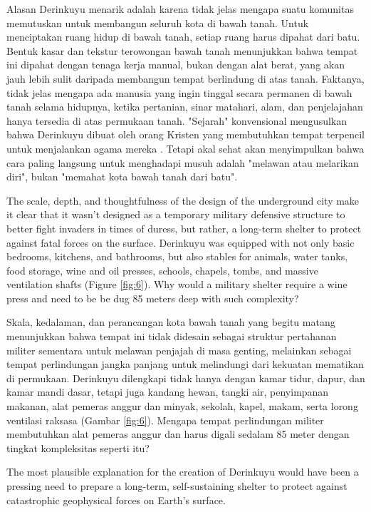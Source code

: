 \documentclass[10pt,twocolumn,letterpaper]{article}
\begin{document}
Alasan Derinkuyu menarik adalah karena tidak jelas mengapa suatu komunitas memutuskan untuk membangun seluruh kota di bawah tanah. Untuk menciptakan ruang hidup di bawah tanah, setiap ruang harus dipahat dari batu. Bentuk kasar dan tekstur terowongan bawah tanah menunjukkan bahwa tempat ini dipahat dengan tenaga kerja manual, bukan dengan alat berat, yang akan jauh lebih sulit daripada membangun tempat berlindung di atas tanah. Faktanya, tidak jelas mengapa ada manusia yang ingin tinggal secara permanen di bawah tanah selama hidupnya, ketika pertanian, sinar matahari, alam, dan penjelajahan hanya tersedia di atas permukaan tanah. "Sejarah" konvensional mengusulkan bahwa Derinkuyu dibuat oleh orang Kristen yang membutuhkan tempat terpencil untuk menjalankan agama mereka \cite{53}. Tetapi akal sehat akan menyimpulkan bahwa cara paling langsung untuk menghadapi musuh adalah "melawan atau melarikan diri", bukan "memahat kota bawah tanah dari batu".

The scale, depth, and thoughtfulness of the design of the underground city make it clear that it wasn't designed as a temporary military defensive structure to better fight invaders in times of duress, but rather, a long-term shelter to protect against fatal forces on the surface. Derinkuyu was equipped with not only basic bedrooms, kitchens, and bathrooms, but also stables for animals, water tanks, food storage, wine and oil presses, schools, chapels, tombs, and massive ventilation shafts (Figure \ref{fig:6}). Why would a military shelter require a wine press and need to be be dug 85 meters deep with such complexity?

Skala, kedalaman, dan perancangan kota bawah tanah yang begitu matang menunjukkan bahwa tempat ini tidak didesain sebagai struktur pertahanan militer sementara untuk melawan penjajah di masa genting, melainkan sebagai tempat perlindungan jangka panjang untuk melindungi dari kekuatan mematikan di permukaan. Derinkuyu dilengkapi tidak hanya dengan kamar tidur, dapur, dan kamar mandi dasar, tetapi juga kandang hewan, tangki air, penyimpanan makanan, alat pemeras anggur dan minyak, sekolah, kapel, makam, serta lorong ventilasi raksasa (Gambar \ref{fig:6}). Mengapa tempat perlindungan militer membutuhkan alat pemeras anggur dan harus digali sedalam 85 meter dengan tingkat kompleksitas seperti itu?

The most plausible explanation for the creation of Derinkuyu would have been a pressing need to prepare a long-term, self-sustaining shelter to protect against catastrophic geophysical forces on Earth's surface.
\end{document}
